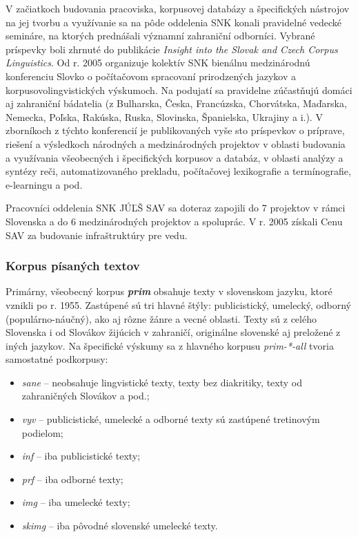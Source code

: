 \begin{multicols}{2}
V začiatkoch budovania pracoviska, korpusovej databázy a
špecifických nástrojov na jej tvorbu a využívanie sa na pôde
oddelenia SNK konali pravidelné vedecké semináre, na ktorých
prednášali významní zahraniční odborníci. Vybrané príspevky
boli zhrnuté do publikácie \emph{Insight into the Slovak and Czech Corpus Linguistics}\cite{simkova2006a}. Od r. 2005 organizuje kolektív SNK bienálnu medzinárodnú konferenciu
Slovko\cite{f10} o
počítačovom spracovaní prirodzených jazykov a
korpusovolingvistických výskumoch. Na podujatí sa pravidelne
zúčastňujú domáci aj zahraniční bádatelia (z Bulharska, Česka,
Francúzska, Chorvátska, Maďarska, Nemecka, Poľska, Rakúska, Ruska,
Slovinska, Španielska, Ukrajiny a i.). V zborníkoch z týchto
konferencií je publikovaných vyše sto príspevkov o príprave,
riešení a výsledkoch národných a medzinárodných projektov v
oblasti budovania a využívania všeobecných i špecifických korpusov
a databáz, v oblasti analýzy a syntézy reči, automatizovaného
prekladu, počítačovej lexikografie a termínografie, e-learningu a
pod. 

Pracovníci oddelenia SNK JÚĽŠ SAV sa doteraz zapojili do 7
projektov v rámci Slovenska a do 6 medzinárodných projektov a
spoluprác\cite{f11}. V r. 2005
získali Cenu SAV za budovanie infraštruktúry pre vedu. 

\subsubsection{Korpus písaných textov}
Primárny, všeobecný korpus {\bf\emph{prim}} obsahuje texty
v slovenskom jazyku, ktoré vznikli po r. 1955.  Zastúpené sú tri
hlavné štýly: publicistický, umelecký, odborný
(populárno-náučný), ako aj rôzne žánre a vecné oblasti. Texty
sú z celého Slovenska i od Slovákov žijúcich v zahraničí,
originálne slovenské aj preložené z iných jazykov. Na špecifické
výskumy sa z hlavného korpusu \emph{prim-*-all} tvoria samostatné
podkorpusy:

\begin{itemize}
\item \emph{sane} – neobsahuje lingvistické texty, texty bez diakritiky, texty od zahraničných Slovákov a pod.;
\item \emph{vyv} – publicistické, umelecké a odborné texty sú zastúpené tretinovým podielom;
\item \emph{inf} – iba publicistické texty;
\item \emph{prf} – iba odborné texty;
\item \emph{img} – iba umelecké texty;
\item \emph{skimg} – iba pôvodné slovenské umelecké texty.
\end{itemize}


\end{multicols}
